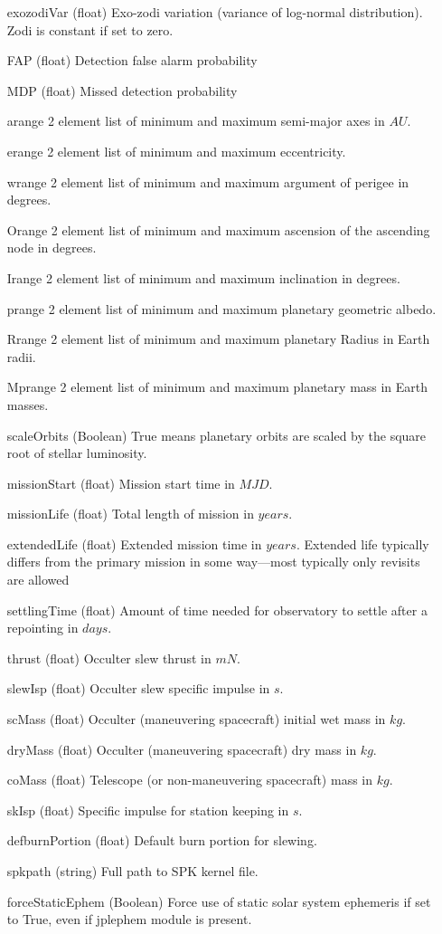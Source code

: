 \documentclass[cleanfoot]{asme2ej}
\begin{document}
\begin{itemize}[leftmargin=1in,font={\ttfamily}]
\item[exozodiVar] (float) Exo-zodi variation (variance of log-normal distribution). Zodi is constant if set to zero. 
\item[FAP] (float) Detection false alarm probability
\item[MDP] (float) Missed detection probability
\item[arange]   2 element list of minimum and maximum semi-major axes in $ AU $. 
\item[erange]   2 element list of minimum and maximum eccentricity.  
\item[wrange]   2 element list of minimum and maximum argument of perigee in degrees. 
\item[Orange]   2 element list of minimum and maximum ascension of the ascending node in degrees.  
\item[Irange]   2 element list of minimum and maximum inclination in degrees.  
\item[prange]   2 element list of minimum and maximum planetary geometric albedo.  
 \item[Rrange]   2 element list of minimum and maximum planetary Radius in Earth radii.  
\item[Mprange]   2 element list of minimum and maximum planetary mass in Earth masses.  
\item [scaleOrbits]   (Boolean) True means planetary orbits are scaled by the square root of stellar luminosity. 
\item[missionStart]  (float) Mission start time in $ MJD $. 
\item[missionLife]  (float) Total length of mission in $ years $. 
\item[extendedLife]  (float) Extended mission time in $ years $.  Extended life typically differs from the primary mission in some way---most typically only revisits are allowed
\item[settlingTime] (float) Amount of time needed for observatory to settle after a repointing in $ days $.             
\item[thrust] (float) Occulter slew thrust in $ mN $.
\item[slewIsp] (float) Occulter slew specific impulse in $ s $. 
\item[scMass] (float) Occulter (maneuvering spacecraft) initial wet mass in $ kg $. 
\item[dryMass] (float) Occulter (maneuvering spacecraft) dry mass in $ kg $. 
\item[coMass] (float) Telescope (or non-maneuvering spacecraft) mass in $ kg $. 
\item[skIsp] (float) Specific impulse for station keeping in $ s $. 
\item[defburnPortion] (float) Default burn portion for slewing. 
\item[spkpath] (string) Full path to SPK kernel file.
\item[forceStaticEphem]  (Boolean) Force use of static solar system ephemeris if set to True, even if jplephem module is present.
\end{itemize}
\end{document}
